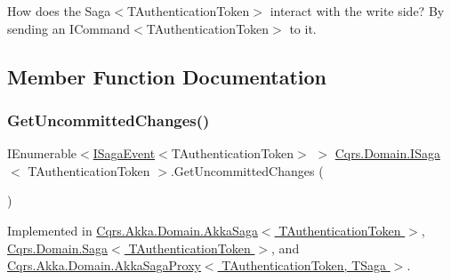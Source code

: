 How does the Saga$<$\+T\+Authentication\+Token$>$ interact with the write side? By sending an I\+Command$<$\+T\+Authentication\+Token$>$ to it. 

\subsection{Member Function Documentation}
\mbox{\label{interfaceCqrs_1_1Domain_1_1ISaga_abb77811b4f7d19adb61f9d33da18e7e0_abb77811b4f7d19adb61f9d33da18e7e0}} 
\subsubsection{\texorpdfstring{Get\+Uncommitted\+Changes()}{GetUncommittedChanges()}}
{\footnotesize\ttfamily I\+Enumerable$<$\hyperlink{interfaceCqrs_1_1Events_1_1ISagaEvent}{I\+Saga\+Event}$<$T\+Authentication\+Token$>$ $>$ \hyperlink{interfaceCqrs_1_1Domain_1_1ISaga}{Cqrs.\+Domain.\+I\+Saga}$<$ T\+Authentication\+Token $>$.Get\+Uncommitted\+Changes (\begin{DoxyParamCaption}{ }\end{DoxyParamCaption})}



Implemented in \hyperlink{classCqrs_1_1Akka_1_1Domain_1_1AkkaSaga_ac88061e29e3e2223db31ce9075835b46_ac88061e29e3e2223db31ce9075835b46}{Cqrs.\+Akka.\+Domain.\+Akka\+Saga$<$ T\+Authentication\+Token $>$}, \hyperlink{classCqrs_1_1Domain_1_1Saga_a043e8e21e7550c34f5848af7a87e33cd_a043e8e21e7550c34f5848af7a87e33cd}{Cqrs.\+Domain.\+Saga$<$ T\+Authentication\+Token $>$}, and \hyperlink{classCqrs_1_1Akka_1_1Domain_1_1AkkaSagaProxy_a8cad3415bc5474a01bfdb2db3a852ea5_a8cad3415bc5474a01bfdb2db3a852ea5}{Cqrs.\+Akka.\+Domain.\+Akka\+Saga\+Proxy$<$ T\+Authentication\+Token, T\+Saga $>$}.

\mbox{\label{interfaceCqrs_1_1Domain_1_1ISaga_a2714804684bc65cf4dec79b4697b9b21_a2714804684bc65cf4dec79b4697b9b21}} 
